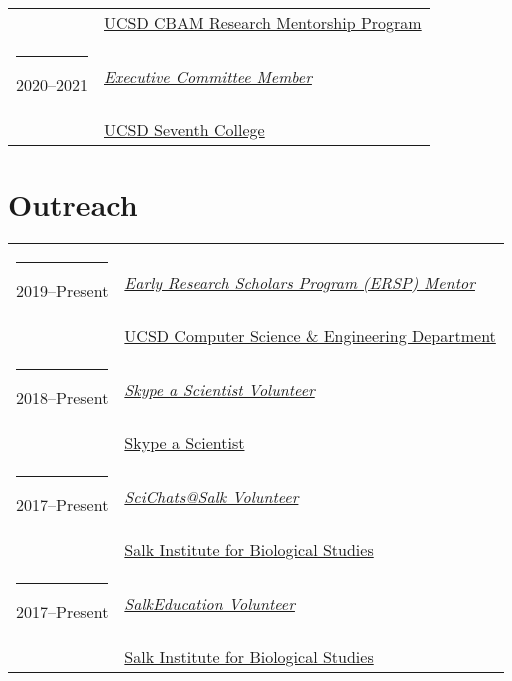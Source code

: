 \documentclass[margin,line]{res}
\begin{document}
\begin{resume}
\begin{longtable}{@{}p{0.7in}p{4in}}
\hspace*{-4mm} & \hspace{4mm} \href{https://sites.google.com/eng.ucsd.edu/cbam}{UCSD CBAM Research Mentorship Program}\\
\hspace*{-4mm} \rule{-1mm}{5mm} 2020--2021 & \href{https://seventh.ucsd.edu/about/faculty/index.html#Executive-Committee}{\textit{Executive Committee Member}}\\*
\hspace*{-4mm} & \hspace{4mm} \href{https://seventh.ucsd.edu/}{UCSD Seventh College}\\
\end{longtable}

\section{\sc Outreach}
\begin{longtable}{@{}p{0.7in}p{4in}}\rule{-1mm}{4.5mm}
\hspace*{-4mm} 2019--Present & \href{http://ersp.ucsd.edu/}{\textit{Early Research Scholars Program (ERSP) Mentor}}\\*
\hspace*{-4mm} & \hspace{4mm} \href{http://cse.ucsd.edu}{UCSD Computer Science \& Engineering Department}\\
\hspace*{-4mm} \rule{-1mm}{5mm} 2018--Present & \href{https://www.skypeascientist.com/}{\textit{Skype a Scientist Volunteer}}\\*
\hspace*{-4mm} & \hspace{4mm} \href{https://www.skypeascientist.com/}{Skype a Scientist}\\
\hspace*{-4mm} \rule{-1mm}{5mm} 2017--Present & \href{http://education.salk.edu/scientist-profile-niema-moshiri/}{\textit{SciChats@Salk Volunteer}}\\*
\hspace*{-4mm} & \hspace{4mm} \href{https://www.salk.edu/}{Salk Institute for Biological Studies}\\
\hspace*{-4mm} \rule{-1mm}{5mm} 2017--Present & \href{https://www.salk.edu/about/education-outreach/}{\textit{SalkEducation Volunteer}}\\*
\hspace*{-4mm} & \hspace{4mm} \href{https://www.salk.edu/}{Salk Institute for Biological Studies}\\

\end{longtable}
\end{resume}
\end{document}
